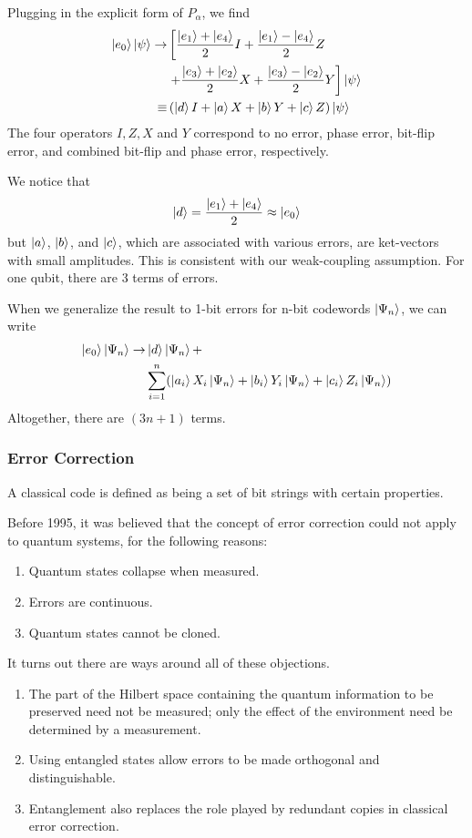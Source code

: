 Plugging in the explicit form of $P_\alpha$, we find
\begin{align*}
    \ket{e_0}\ket{\psi}\rightarrow& \left[ \frac{\ket{e_1}+\ket{e_4}}{2}I+\frac{\ket{e_1}-\ket{e_4}}{2}Z\right. \\
    &\left. +\frac{\ket{e_3}+\ket{e_2}}{2}X+\frac{\ket{e_3}-\ket{e_2}}{2}Y \right] \ket{\psi}\\
    \equiv & \left( \ket{d}I+\ket{a}X+\ket{b}Y+\ket{c}Z \right)\ket{\psi}
\end{align*}
The four operators $I, Z, X$ and $Y$ correspond to no error, phase error, bit-ﬂip error, and combined bit-ﬂip and phase error, respectively.

We notice that
\begin{align*}
    \ket{d}=\frac{\ket{e_1}+\ket{e_4}}{2}\approx\ket{e_0}
\end{align*}
but $\ket{a}$, $\ket{b}$, and $\ket{c}$, which are associated with various errors, are ket-vectors with small amplitudes. This is consistent with our weak-coupling assumption. For one qubit, there are 3 terms of errors.

When we generalize the result to 1-bit errors for n-bit codewords $\ket{\Psi_n}$, we can write
\begin{align*}
    \ket{e_0}\ket{\Psi_n}\rightarrow & \ket{d}\ket{\Psi_n}+\\
    &\sum_{i=1}^n(\ket{a_i} X_i \ket{\Psi_n} + \ket{b_i} Y_i \ket{\Psi_n} + \ket{c_i} Z_i \ket{\Psi_n} )
\end{align*}
Altogether, there are $(3n + 1)$ terms.

\subsubsection{Error Correction}
A classical code is defined as being a set of bit strings with certain properties.

Before 1995, it was believed that the concept of error correction could not apply to quantum systems, for the following reasons:
\begin{enumerate}\small
    \item Quantum states collapse when measured.
    \item Errors are continuous.
    \item Quantum states cannot be cloned.
\end{enumerate}

It turns out there are ways around all of these objections.
\begin{enumerate}\small
    \item The part of the Hilbert space containing the quantum information to be preserved need not be measured; only the eﬀect of the environment need be determined by a measurement. 
    \item Using entangled states allow errors to be made orthogonal and distinguishable. 
    \item Entanglement also replaces the role played by redundant copies in classical error correction.
\end{enumerate}

